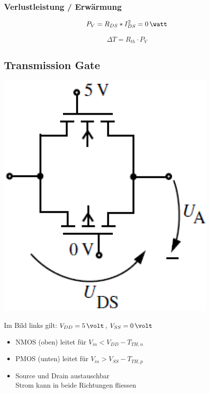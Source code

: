 \subsubsection{Verlustleistung / Erwärmung}

\begin{minipage}[c]{0.48\columnwidth}
    $$ P_V = R_{DS} * I_{DS}^2 = 0 \, \watt $$
\end{minipage}
\hfill
\begin{minipage}[c]{0.48\columnwidth}
    $$ \Delta T = R_{th} \cdot P_V $$
\end{minipage}


\subsection{Transmission Gate}

\begin{minipage}[c]{0.25\columnwidth}
    \includegraphics[width=\columnwidth]{images/transmission_gate.png}
\end{minipage}
\hfill
\begin{minipage}[c]{0.68\columnwidth}
    Im Bild links gilt: $V_{DD} = 5 \, \volt$, $V_{SS} = 0 \, \volt$ 

    \begin{itemize}
        \item NMOS (oben) leitet für $V_{in} < V_{DD} - T_{TH,n}$
        \item PMOS (unten) leitet für $V_{in} > V_{SS} - T_{TH,p}$
        \item Source und Drain austauschbar \\
            \textrightarrow Strom kann in beide Richtungen fliessen
    \end{itemize}
\end{minipage}